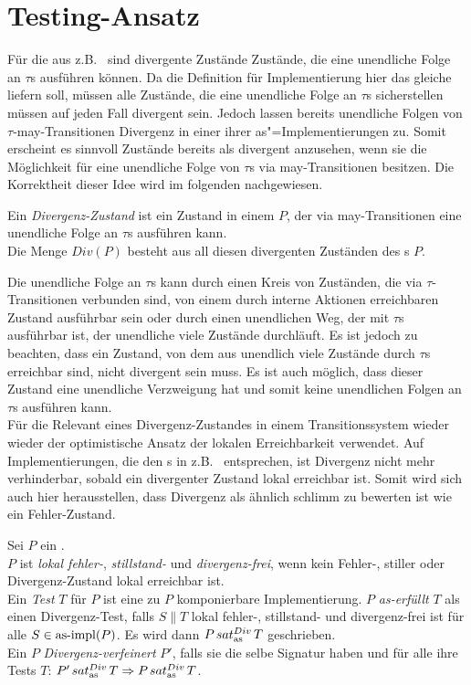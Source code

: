 \section{Testing-Ansatz}

Für die \EIO{} aus z.B.~\cite{Schinko2016BA} sind divergente Zustände Zustände,
die eine unendliche Folge an $\tau$s ausführen können. Da die Definition für
Implementierung hier das gleiche liefern soll, müssen alle Zustände, die eine
unendliche Folge an $\tau$s sicherstellen müssen auf jeden Fall divergent sein.
Jedoch lassen bereits unendliche Folgen von $\tau$-may-Transitionen Divergenz
in einer ihrer as"=Implementierungen zu. Somit erscheint es sinnvoll Zustände
bereits als divergent anzusehen, wenn sie die Möglichkeit für eine unendliche
Folge von $\tau$s via may-Transitionen besitzen. Die Korrektheit dieser Idee
wird im folgenden nachgewiesen.

\begin{Def}[Divergenz]
  Ein \emph{Divergenz-Zustand} ist ein Zustand in einem \MEIO{} $P$, der via
  may-Transitionen eine unendliche Folge an $\tau$s ausführen kann.\\
  Die Menge $Div(P)$ besteht aus all diesen divergenten Zuständen des \MEIO{}s
  $P$.
\end{Def}

Die unendliche Folge an $\tau$s kann durch einen Kreis von Zuständen, die via
$\tau$-Transitionen verbunden sind, von einem durch interne Aktionen
erreichbaren Zustand ausführbar sein oder durch einen unendlichen Weg, der mit
$\tau$s ausführbar ist, der unendliche viele Zustände durchläuft. Es ist jedoch
zu beachten, dass ein Zustand, von dem aus unendlich viele Zustände durch
$\tau$s  erreichbar sind, nicht divergent sein muss. Es ist auch möglich,
dass dieser Zustand eine unendliche Verzweigung hat und somit keine unendlichen
Folgen an $\tau$s ausführen kann.\\
Für die Relevant eines Divergenz-Zustandes in einem Transitionssystem wieder
wieder der optimistische Ansatz der lokalen Erreichbarkeit verwendet. Auf
Implementierungen, die den \EIO{}s in z.B.~\cite{Schinko2016BA} entsprechen,
ist Divergenz nicht mehr verhinderbar, sobald ein divergenter Zustand lokal
erreichbar ist. Somit wird sich auch hier herausstellen, dass Divergenz als
ähnlich \glqq schlimm\grqq{} zu bewerten ist wie ein Fehler-Zustand.

\begin{Def}
  \label{DivTestDef}
  Sei $P$ ein \MEIO{}.\\
  $P$ ist \emph{lokal fehler-}, \emph{stillstand-} und \emph{divergenz-frei},
  wenn kein Fehler-, stiller oder Divergenz-Zustand lokal erreichbar ist.\\
  Ein \emph{Test} $T$ für $P$ ist eine zu $P$ komponierbare Implementierung.
  $P$ \emph{as-erfüllt} $T$ als einen Divergenz-Test, falls $S\|T$ lokal
  fehler-, stillstand- und divergenz-frei ist für alle $S\in \mathrm{as}\text{-}\mathrm{impl} (P)$. Es
  wird dann $P\hspace{0.05cm}sat_\mathrm{as}^{Div}\hspace{0.05cm} T$ geschrieben.\\
  Ein \MEIO{} $P$ \emph{Divergenz-verfeinert} $P'$, falls sie die selbe
  Signatur haben und für alle ihre Tests $T$: $P'\hspace{0.05cm}sat_\mathrm{as}^{Div}\hspace{0.05cm} T \Rightarrow P\hspace{0.05cm}sat_\mathrm{as}^{Div}\hspace{0.05cm}
  T$.
\end{Def}

